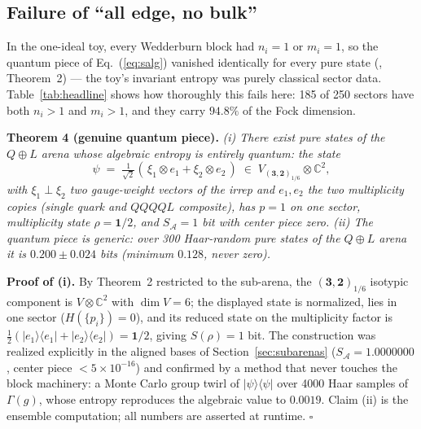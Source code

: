 \documentclass[11pt]{article}
\newcommand{\CC}{\mathbb{C}}
\newcommand{\SA}{S_{\mathcal{A}}}
\newcommand{\rep}[2]{(\mathbf{#1})_{#2}}
\begin{document}
\subsection{Failure of ``all edge, no bulk''}

In the one-ideal toy, every Wedderburn block had $n_i = 1$ or $m_i = 1$, so the quantum piece of Eq.~(\ref{eq:salg}) vanished identically for every pure state (\cite{p2}, Theorem~2) --- the toy's invariant entropy was purely classical sector data. Table~\ref{tab:headline} shows how thoroughly this fails here: 185 of 250 sectors have both $n_i > 1$ and $m_i > 1$, and they carry $94.8\%$ of the Fock dimension.

\medskip

\noindent\textbf{Theorem 4 (genuine quantum piece).} \emph{(i) There exist pure states of the $Q\oplus L$ arena whose algebraic entropy is entirely quantum: the state}
\begin{equation*}
\psi \;=\; \tfrac{1}{\sqrt2}\left(\,\xi_{1}\otimes e_1 + \xi_{2}\otimes e_2\,\right) \;\in\; V_{\rep{3,2}{1/6}}\otimes\CC^2,
\end{equation*}
\emph{with $\xi_1\perp\xi_2$ two gauge-weight vectors of the irrep and $e_1, e_2$ the two multiplicity copies (single quark and $QQQQL$ composite), has $p = 1$ on one sector, multiplicity state $\rho = \mathbf{1}/2$, and $\SA = 1$ bit with center piece zero. (ii) The quantum piece is generic: over 300 Haar-random pure states of the $Q\oplus L$ arena it is $0.200\pm0.024$ bits (minimum $0.128$, never zero).}

\medskip

\noindent\textbf{Proof of (i).} By Theorem~2 restricted to the sub-arena, the $\rep{3,2}{1/6}$ isotypic component is $V\otimes\CC^2$ with $\dim V = 6$; the displayed state is normalized, lies in one sector ($H(\{p_i\}) = 0$), and its reduced state on the multiplicity factor is $\frac12(|e_1\rangle\langle e_1| + |e_2\rangle\langle e_2|) = \mathbf{1}/2$, giving $S(\rho) = 1$ bit. The construction was realized explicitly in the aligned bases of Section~\ref{sec:subarenas} ($\SA = 1.0000000$, center piece $< 5\times10^{-16}$) and confirmed by a method that never touches the block machinery: a Monte Carlo group twirl of $|\psi\rangle\langle\psi|$ over 4000 Haar samples of $\Gamma(g)$, whose entropy reproduces the algebraic value to $0.0019$. Claim (ii) is the ensemble computation; all numbers are asserted at runtime. \hfill$\square$

\medskip
\end{document}
